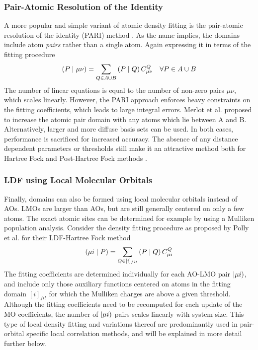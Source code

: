 
\subsubsection{Pair-Atomic Resolution of the Identity}

A more popular and simple variant of atomic density fitting is the pair-atomic resolution of the identity (PARI) method \cite{Mer2013}. As the name implies, the domains include atom \emph{pairs} rather than a single atom. Again expressing it in terms of the fitting procedure
\begin{equation}
\left( P \mid \mu\nu \right) = \sum_{Q \in A \cup B} \left( P \mid Q \right) C^Q_{\mu\nu} \quad \forall P \in A \cup B
\end{equation}
\noindent The number of linear equations is equal to the number of non-zero pairs $\mu\nu$, which scales linearly. However, the PARI approach enforces heavy constraints on the fitting coefficients, which leads to large integral errors. Merlot et al. proposed to increase the atomic pair domain with any atoms which lie between A and B. Alternatively, larger and more diffuse basis sets can be used. In both cases, performance is sacrificed for increased accuracy. The absence of any distance dependent parameters or thresholds still make it an attractive method both for Hartree Fock and Post-Hartree Fock methods \cite{Man2015,For2020}.


\subsubsection{LDF using Local Molecular Orbitals}

Finally, domains can also be formed using local molecular orbitals instead of AOs. LMOs are larger than AOs, but are still generally centered on only a few atoms. The exact atomic sites can be determined for example by using a Mulliken population analysis. Consider the density fitting procedure as proposed by Polly et al. for their LDF-Hartree Fock method \cite{Pol2004}
\begin{equation}
\left( \mu i \mid P \right) = \sum_{Q \in [i]_{fit}} \left( P \mid Q \right) C^Q_{\mu i}
\end{equation}
The fitting coefficients are determined individually for each AO-LMO pair $\left\lvert \mu i \right)$, and include only those auxiliary functions centered on atoms in the fitting domain $[i]_{fit}$ for which the Mulliken charges are above a given threshold. Although the fitting coefficients need to be recomputed for each update of the MO coefficients, the number of $\left\lvert \mu i \right)$ pairs scales linearly with system size. This type of local density fitting and variations thereof are predominantly used in pair-orbital specific local correlation methods, and will be explained in more detail further below. 

